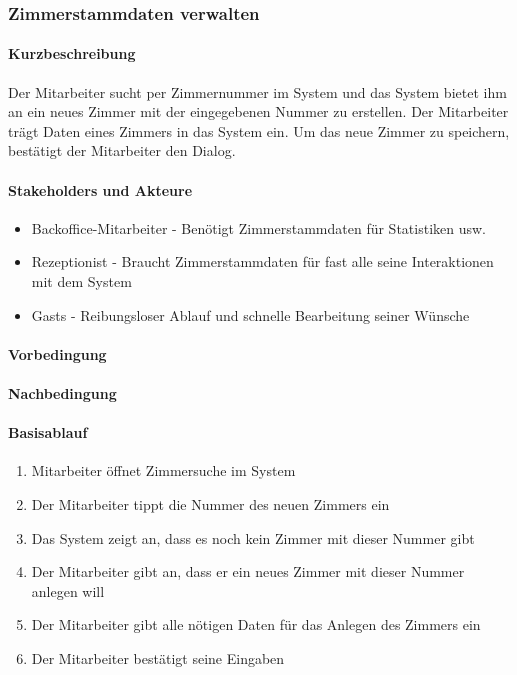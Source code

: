 \subsubsection{Zimmerstammdaten verwalten}

\paragraph{Kurzbeschreibung}
Der Mitarbeiter sucht per Zimmernummer im System und das System bietet ihm an ein neues Zimmer mit der eingegebenen Nummer zu erstellen. Der Mitarbeiter trägt Daten eines Zimmers in das System ein. Um das neue Zimmer zu speichern, bestätigt der Mitarbeiter den Dialog.

\paragraph{Stakeholders und Akteure}
\begin{itemize}
	\item Backoffice-Mitarbeiter - Benötigt Zimmerstammdaten für Statistiken usw.
	\item \Gls{Rezeptionist} - Braucht Zimmerstammdaten für fast alle seine Interaktionen mit dem System
	\item \Glspl{Gast} - Reibungsloser Ablauf und schnelle Bearbeitung seiner Wünsche
\end{itemize}

\paragraph{Vorbedingung}


\paragraph{Nachbedingung}

\paragraph{Basisablauf}
\begin{enumerate}
	\item Mitarbeiter öffnet Zimmersuche im System
	\item Der Mitarbeiter tippt die Nummer des neuen Zimmers ein
	\item Das System zeigt an, dass es noch kein Zimmer mit dieser Nummer gibt
	\item Der Mitarbeiter gibt an, dass er ein neues Zimmer mit dieser Nummer anlegen will
	\item Der Mitarbeiter gibt alle nötigen Daten für das Anlegen des Zimmers ein
	\item Der Mitarbeiter bestätigt seine Eingaben
\end{enumerate}

